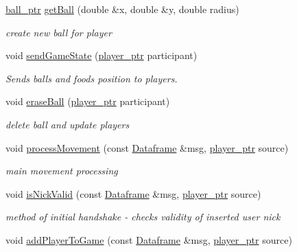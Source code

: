\begin{DoxyCompactItemize}
\hyperlink{namespacewebsocket_aae1d9cf317a0fb0b83bdfc2f92df77c7}{ball\+\_\+ptr} \hyperlink{classwebsocket_1_1GameBoard_ac9ebf0c8fc6a76a60fcc83d60719b161}{get\+Ball} (double \&x, double \&y, double radius)
\begin{DoxyCompactList}\small\item\em create new ball for player \end{DoxyCompactList}\item 
void \hyperlink{classwebsocket_1_1GameBoard_a581a9aeb4f1e70892a70a238bba6469a}{send\+Game\+State} (\hyperlink{namespacewebsocket_aec8d52893bdf524a1412533a63b006a3}{player\+\_\+ptr} participant)
\begin{DoxyCompactList}\small\item\em Sends balls and foods position to players. \end{DoxyCompactList}\item 
void \hyperlink{classwebsocket_1_1GameBoard_ac9130252983df425bcefd450f4aa8742}{erase\+Ball} (\hyperlink{namespacewebsocket_aec8d52893bdf524a1412533a63b006a3}{player\+\_\+ptr} participant)
\begin{DoxyCompactList}\small\item\em delete ball and update players \end{DoxyCompactList}\item 
void \hyperlink{classwebsocket_1_1GameBoard_a40aed2036d1065d0bfa24d4e84da1418}{process\+Movement} (const \hyperlink{structwebsocket_1_1Dataframe}{Dataframe} \&msg, \hyperlink{namespacewebsocket_aec8d52893bdf524a1412533a63b006a3}{player\+\_\+ptr} source)
\begin{DoxyCompactList}\small\item\em main movement processing \end{DoxyCompactList}\item 
void \hyperlink{classwebsocket_1_1GameBoard_a20af876986152e2c4db78174d186d2b6}{is\+Nick\+Valid} (const \hyperlink{structwebsocket_1_1Dataframe}{Dataframe} \&msg, \hyperlink{namespacewebsocket_aec8d52893bdf524a1412533a63b006a3}{player\+\_\+ptr} source)
\begin{DoxyCompactList}\small\item\em method of initial handshake -\/ checks validity of inserted user nick \end{DoxyCompactList}\item 
void \hyperlink{classwebsocket_1_1GameBoard_ad6da3630e77cf3da0563072e5c1ec162}{add\+Player\+To\+Game} (const \hyperlink{structwebsocket_1_1Dataframe}{Dataframe} \&msg, \hyperlink{namespacewebsocket_aec8d52893bdf524a1412533a63b006a3}{player\+\_\+ptr} source)

\end{DoxyCompactItemize}
